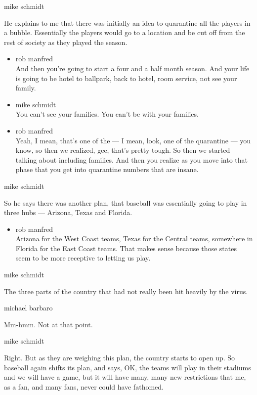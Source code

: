 mike schmidt

He explains to me that there was initially an idea to quarantine all the
players in a bubble. Essentially the players would go to a location and
be cut off from the rest of society as they played the season.

\begin{itemize}
\item
  rob manfred\\
  And then you're going to start a four and a half month season. And
  your life is going to be hotel to ballpark, back to hotel, room
  service, not see your family.
\item
  mike schmidt\\
  You can't see your families. You can't be with your families.
\item
  rob manfred\\
  Yeah, I mean, that's one of the --- I mean, look, one of the
  quarantine --- you know, so then we realized, gee, that's pretty
  tough. So then we started talking about including families. And then
  you realize as you move into that phase that you get into quarantine
  numbers that are insane.
\end{itemize}

mike schmidt

So he says there was another plan, that baseball was essentially going
to play in three hubs --- Arizona, Texas and Florida.

\begin{itemize}
\tightlist
\item
  rob manfred\\
  Arizona for the West Coast teams, Texas for the Central teams,
  somewhere in Florida for the East Coast teams. That makes sense
  because those states seem to be more receptive to letting us play.
\end{itemize}

mike schmidt

The three parts of the country that had not really been hit heavily by
the virus.

michael barbaro

Mm-hmm. Not at that point.

mike schmidt

Right. But as they are weighing this plan, the country starts to open
up. So baseball again shifts its plan, and says, OK, the teams will play
in their stadiums and we will have a game, but it will have many, many
new restrictions that me, as a fan, and many fans, never could have
fathomed.

